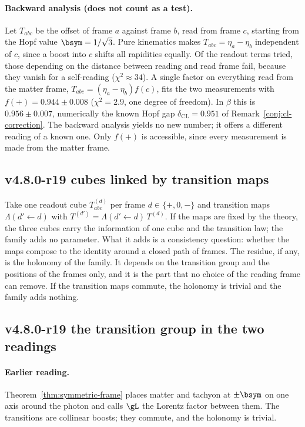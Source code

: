 \paragraph{Backward analysis (does not count as a test).}
Let \(T_{abc}\) be the offset of frame \(a\) against frame \(b\), read from frame \(c\), starting from the Hopf value
\(\bsym=1/\sqrt3\).  Pure kinematics makes \(T_{abc}=\eta_a-\eta_b\) independent of \(c\), since a boost into \(c\)
shifts all rapidities equally.  Of the readout terms tried, those depending on the distance between reading and read
frame fail, because they vanish for a self-reading (\(\chi^2\approx34\)).  A single factor on everything read from
the matter frame, \(T_{abc}=(\eta_a-\eta_b)f(c)\), fits the two measurements with \(f(+)=0.944\pm0.008\)
(\(\chi^2=2.9\), one degree of freedom).  In \(\beta\) this is \(0.956\pm0.007\), numerically the known Hopf gap
\(\delta_{\mathrm{CL}}=0.951\) of Remark~\ref{conj:cl-correction}.  The backward analysis yields no new number; it
offers a different reading of a known one.  Only \(f(+)\) is accessible, since every measurement is made from the
matter frame.

\subsection*{v4.8.0-r19 cubes linked by transition maps}
\label{subsec:v480-r19-cubes}

Take one readout cube \(T^{(d)}_{abc}\) per frame \(d\in\{+,0,-\}\) and transition maps
\(\Lambda(d'\!\leftarrow\!d)\) with \(T^{(d')}=\Lambda(d'\!\leftarrow\!d)\,T^{(d)}\).  If the maps are fixed by the
theory, the three cubes carry the information of one cube and the transition law; the family adds no parameter.
What it adds is a consistency question: whether the maps compose to the identity around a closed path of frames.  The
residue, if any, is the holonomy of the family.  It depends on the transition group and the positions of the frames
only, and it is the part that no choice of the reading frame can remove.  If the transition maps commute, the
holonomy is trivial and the family adds nothing.

\subsection*{v4.8.0-r19 the transition group in the two readings}
\label{subsec:v480-r19-transition-group}

\paragraph{Earlier reading.}
Theorem~\ref{thm:symmetric-frame} places matter and tachyon at \(\pm\bsym\) on one axis around the photon and calls
\(\gL\) the Lorentz factor between them.  The transitions are collinear boosts; they commute, and the holonomy is
trivial.

